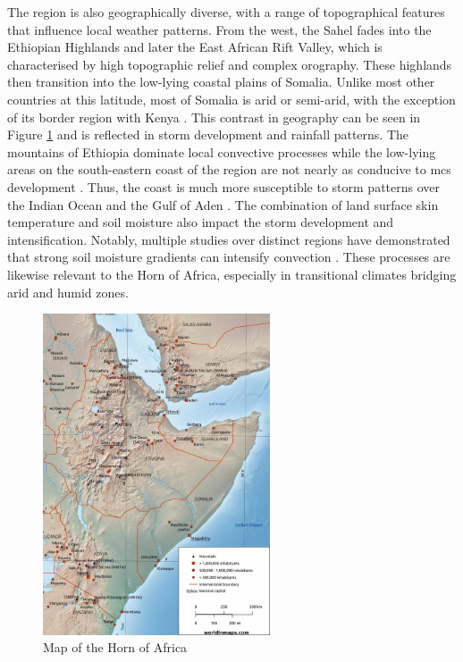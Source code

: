 The region is also geographically diverse, with a range of topographical features that influence local weather patterns. From the west, the Sahel fades into the Ethiopian Highlands and later the East African Rift Valley, which is characterised by high topographic relief and complex orography. These highlands then transition into the low-lying coastal plains of Somalia. Unlike most other countries at this latitude, most of Somalia is arid or semi-arid, with the exception of its border region with Kenya \citep{Beck2023}. This contrast in geography can be seen in Figure \ref{fig:horn-of-africa} and is reflected in storm development and rainfall patterns. The mountains of Ethiopia dominate local convective processes while the low-lying areas on the south-eastern coast of the region are not nearly as conducive to \acrshort{mcs} development \citep{Negash2024,Camberlin2024}. Thus, the coast is much more susceptible to storm patterns over the Indian Ocean and the Gulf of Aden \citep{Camberlin2024}. The combination of land surface skin temperature and soil moisture also impact the storm development and intensification. Notably, multiple studies over distinct regions have demonstrated that strong soil moisture gradients can intensify convection \citep{Barton2021,Klein2020,Taylor2017}. These processes are likewise relevant to the Horn of Africa, especially in transitional climates bridging arid and humid zones.

\begin{figure}[ht]
    \centering
    \includegraphics[width=0.6\textwidth]{../figures/static/horn-of-africa-map-scaled.jpeg}
    \caption{Map of the Horn of Africa \citep{WorldInMaps2024}}
    \label{fig:horn-of-africa}
\end{figure}

